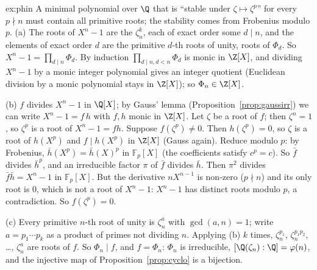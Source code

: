 \begin{solution}{ex:phin}
\idea A minimal polynomial over $\Q$ that is ``stable under $\zeta\mapsto\zeta^p$'' for every $p\nmid n$ must contain all primitive roots; the stability comes from Frobenius modulo $p$.
\writeup (a) The roots of $X^n-1$ are the $\zeta_n^k$, each of exact order some $d\mid n$, and the elements of exact order $d$ are the primitive $d$-th roots of unity, roots of $\Phi_d$. So $X^n-1=\prod_{d\mid n}\Phi_d$. By induction $\prod_{d\mid n,d<n}\Phi_d$ is monic in $\Z[X]$, and dividing $X^n-1$ by a monic integer polynomial gives an integer quotient (Euclidean division by a monic polynomial stays in $\Z[X]$); so $\Phi_n\in\Z[X]$.

(b) $f$ divides $X^n-1$ in $\Q[X]$; by Gauss' lemma (Proposition~\ref{prop:gaussirr}) we can write $X^n-1=f\,h$ with $f,h$ monic in $\Z[X]$. Let $\zeta$ be a root of $f$; then $\zeta^n=1$, so $\zeta^p$ is a root of $X^n-1=fh$. Suppose $f(\zeta^p)\ne0$. Then $h(\zeta^p)=0$, so $\zeta$ is a root of $h(X^p)$ and $f\mid h(X^p)$ in $\Z[X]$ (Gauss again). Reduce modulo $p$: by Frobenius, $\bar h(X^p)=\bar h(X)^p$ in $\mathbb F_p[X]$ (the coefficients satisfy $c^p=c$). So $\bar f$ divides $\bar h^p$, and an irreducible factor $\pi$ of $\bar f$ divides $\bar h$. Then $\pi^2$ divides $\bar f\bar h=X^n-1$ in $\mathbb F_p[X]$. But the derivative $nX^{n-1}$ is non-zero ($p\nmid n$) and its only root is $0$, which is not a root of $X^n-1$: $X^n-1$ has distinct roots modulo $p$, a contradiction. So $f(\zeta^p)=0$.

(c) Every primitive $n$-th root of unity is $\zeta_n^a$ with $\gcd(a,n)=1$; write $a=p_1\cdots p_k$ as a product of primes not dividing $n$. Applying (b) $k$ times, $\zeta_n^{p_1}$, $\zeta_n^{p_1p_2}$, \dots, $\zeta_n^a$ are roots of $f$. So $\Phi_n\mid f$, and $f=\Phi_n$: $\Phi_n$ is irreducible, $[\Q(\zeta_n):\Q]=\varphi(n)$, and the injective map of Proposition~\ref{prop:cyclo} is a bijection.
\end{solution}

